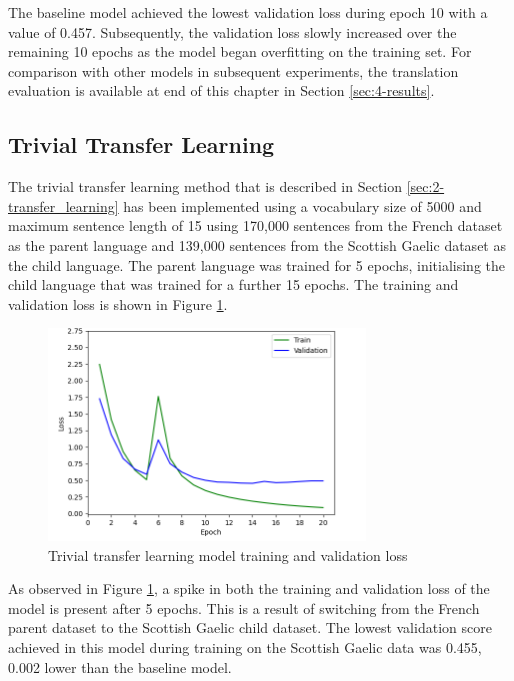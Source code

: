 The baseline model achieved the lowest validation loss during epoch 10 with a value of 0.457. Subsequently, the validation loss slowly increased over the remaining 10 epochs as the model began overfitting on the training set. For comparison with other models in subsequent experiments, the translation evaluation is available at end of this chapter in Section \ref{sec:4-results}.

\newpage
\subsection{Trivial Transfer Learning}
\label{sec:4-trivial}

The trivial transfer learning method that is described in Section \ref{sec:2-transfer_learning} has been implemented using a vocabulary size of 5000 and maximum sentence length of 15 using 170,000 sentences from the French dataset as the parent language and 139,000 sentences from the Scottish Gaelic dataset as the child language. The parent language was trained for 5 epochs, initialising the child language that was trained for a further 15 epochs. The training and validation loss is shown in Figure \ref{fig:loss_trivial}.

\begin{figure}[ht!]
\centering
\includegraphics[width=0.75\textwidth]{media/experiments/loss/5k/loss_trivial.png}
\captionsetup{justification=centering}
\caption[Trivial transfer learning model training and validation loss]{Trivial transfer learning model training and validation loss}
\label{fig:loss_trivial}
\end{figure}

As observed in Figure \ref{fig:loss_trivial}, a spike in both the training and validation loss of the model is present after 5 epochs. This is a result of switching from the French parent dataset to the Scottish Gaelic child dataset. The lowest validation score achieved in this model during training on the Scottish Gaelic data was 0.455, 0.002 lower than the baseline model.

